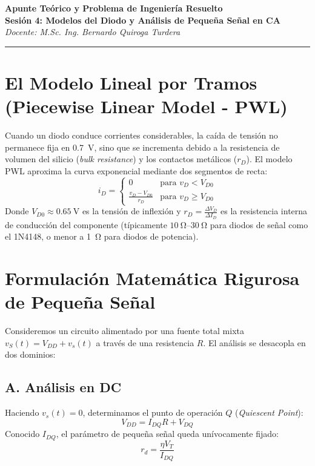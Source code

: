 \documentclass[11pt, a4paper]{article}
\begin{document}
\begin{center}
    {\LARGE \textbf{Apunte Teórico y Problema de Ingeniería Resuelto}}\\[0.3cm]
    {\large \textbf{Sesión 4: Modelos del Diodo y Análisis de Pequeña Señal en CA}}\\
    \textit{Docente: M.Sc. Ing. Bernardo Quiroga Turdera}
    \vspace{0.3cm}
    \hrule
\end{center}
\vspace{0.4cm}

\section{El Modelo Lineal por Tramos (Piecewise Linear Model - PWL)}
Cuando un diodo conduce corrientes considerables, la caída de tensión no permanece fija en \qty{0.7}{\volt}, sino que se incrementa debido a la resistencia de volumen del silicio (\textit{bulk resistance}) y los contactos metálicos ($r_D$). El modelo PWL aproxima la curva exponencial mediante dos segmentos de recta:
\begin{equation}
    i_D = 
    \begin{cases} 
        0 & \text{para } v_D < V_{D0} \\ 
        \frac{v_D - V_{D0}}{r_D} & \text{para } v_D \ge V_{D0} 
    \end{cases}
\end{equation}
Donde $V_{D0} \approx \qty{0.65}{\volt}$ es la tensión de inflexión y $r_D = \frac{\Delta V_D}{\Delta I_D}$ es la resistencia interna de conducción del componente (típicamente $\qtyrange{10}{30}{\ohm}$ para diodos de señal como el 1N4148, o menor a \qty{1}{\ohm} para diodos de potencia).

\section{Formulación Matemática Rigurosa de Pequeña Señal}
Consideremos un circuito alimentado por una fuente total mixta $v_S(t) = V_{DD} + v_s(t)$ a través de una resistencia $R$. El análisis se desacopla en dos dominios:

\subsection{A. Análisis en DC}
Haciendo $v_s(t) = 0$, determinamos el punto de operación $Q$ (\textit{Quiescent Point}):
\begin{equation}
    V_{DD} = I_{DQ} R + V_{DQ}
\end{equation}
Conocido $I_{DQ}$, el parámetro de pequeña señal queda unívocamente fijado:
\begin{equation}
    r_d = \frac{\eta V_T}{I_{DQ}}
\end{equation}
\end{document}
